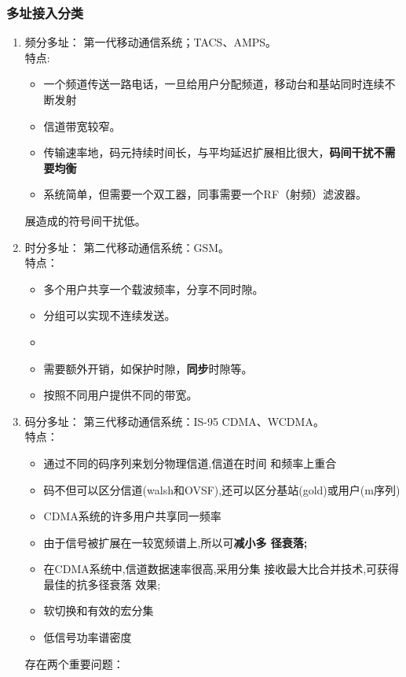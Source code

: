 	\subsubsection{多址接入分类}
	\begin{enumerate}
		\item 频分多址： 第一代移动通信系统；TACS、AMPS。\\特点:
		\begin{itemize}
			\item 一个频道传送一路电话，一旦给用户分配频道，移动台和基站同时连续不断发射
			\item 信道带宽较窄。
			\item 传输速率地，码元持续时间长，与平均延迟扩展相比很大，\textbf{码间干扰不需要均衡}
			\item 系统简单，但需要一个双工器，同事需要一个RF（射频）滤波器。
		\end{itemize}
		展造成的符号间干扰低。
		\item 时分多址： 第二代移动通信系统：GSM。\\特点：
		\begin{itemize}
			\item 多个用户共享一个载波频率，分享不同时隙。
			\item 分组可以实现不连续发送。
			\item {\color{red}{由于速率较高，往往需要均衡器。}}
			\item 需要额外开销，如保护时隙，\textbf{同步}时隙等。
			\item 按照不同用户提供不同的带宽。
		\end{itemize}
		\item 码分多址： 第三代移动通信系统：IS-95 CDMA、WCDMA。\\特点：
		\begin{itemize}
			\item 通过不同的码序列来划分物理信道,信道在时间
			和频率上重合
			\item 码不但可以区分信道(walsh和OVSF),还可以区分基站(gold)或用户(m序列)
			\item  CDMA系统的许多用户共享同一频率
			\item 由于信号被扩展在一较宽频谱上,所以可\textbf{减小多
			径衰落;}
			\item 在CDMA系统中,信道数据速率很高,采用分集
			接收最大比合并技术,可获得最佳的抗多径衰落
			效果;
			\item 软切换和有效的宏分集
			\item  低信号功率谱密度
		\end{itemize}
		存在两个重要问题：

\end{enumerate}
